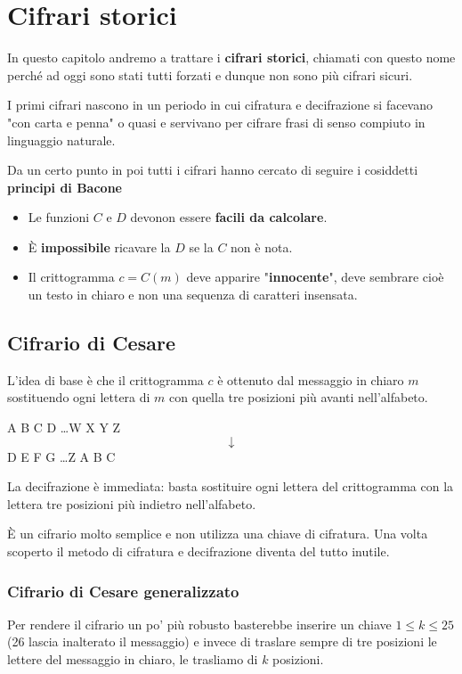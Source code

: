 \chapter{Cifrari storici}
In questo capitolo andremo a trattare i \textbf{cifrari storici}, chiamati con questo nome perch\'e ad oggi sono stati
tutti forzati e dunque non sono pi\`u cifrari sicuri.

I primi cifrari nascono in un periodo in cui cifratura e decifrazione si facevano "con carta e penna" o quasi e servivano
per cifrare frasi di senso compiuto in linguaggio naturale.

Da un certo punto in poi tutti i cifrari hanno cercato di seguire i cosiddetti \textbf{principi di Bacone}
\begin{itemize}
	\item Le funzioni $C$ e $D$ devonon essere \textbf{facili da calcolare}.
	\item \`E \textbf{impossibile} ricavare la $D$ se la $C$ non \`e nota.
	\item Il crittogramma $c = C(m)$ deve apparire "\textbf{innocente}", deve sembrare cio\`e un testo in chiaro e non
	      una sequenza di caratteri insensata.
\end{itemize}

\section{Cifrario di Cesare}
L'idea di base \`e che il crittogramma $c$ \`e ottenuto dal messaggio in chiaro $m$ sostituendo ogni lettera di $m$ con
quella tre posizioni pi\`u avanti nell'alfabeto.

\begin{center}
	A B C D \dots W X Y Z
	\[ \downarrow \]
	D E F G \dots Z A B C
\end{center}
La decifrazione \`e immediata: basta sostituire ogni lettera del crittogramma con la lettera tre posizioni pi\`u indietro
nell'alfabeto.

\`E un cifrario molto semplice e non utilizza una chiave di cifratura. Una volta scoperto il metodo di cifratura e
decifrazione diventa del tutto inutile.

\subsection{Cifrario di Cesare generalizzato}
Per rendere il cifrario un po' pi\`u robusto basterebbe inserire un chiave $1 \leq k \leq 25$ (26 lascia inalterato il
messaggio) e invece di traslare sempre di tre posizioni le lettere del messaggio in chiaro, le trasliamo di $k$
posizioni.

